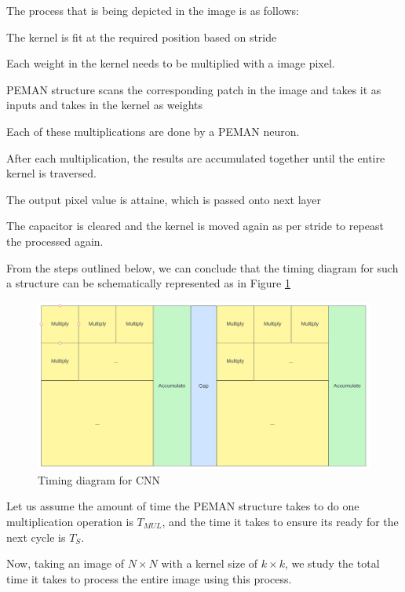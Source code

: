 The process that is being depicted in the image is as follows:

\begin{list}{•}{}
	\item The kernel is fit at the required position based on stride
	\item Each weight in the kernel needs to be multiplied with a image pixel.
	\item PEMAN structure scans the corresponding patch in the image and takes it as inputs and takes in the kernel as weights
	\item Each of these multiplications are done by a PEMAN neuron.
	\item After each multiplication, the results are accumulated together until the entire kernel is traversed.
	\item The output pixel value is attaine, which is passed onto next layer
	\item The capacitor is cleared and the kernel is moved again as per stride to repeast the processed again.
\end{list}

From the steps outlined below, we can conclude that the timing diagram for such a structure can be schematically represented as in Figure \ref{cnn_timing_diagram}

\begin{figure}
	\centering
	\includegraphics[width=\textwidth]{images/convTiming.png}
	\caption{Timing diagram for CNN}
	\label{cnn_timing_diagram}
\end{figure}

Let us assume the amount of time the PEMAN structure takes to do one multiplication operation is $T_{MUL}$, and the time it takes to ensure its ready for the next cycle is $T_S$.

Now, taking an image of $N\times N$ with a kernel size of $k \times k$, we study the total time it takes to process the entire image using this process.

